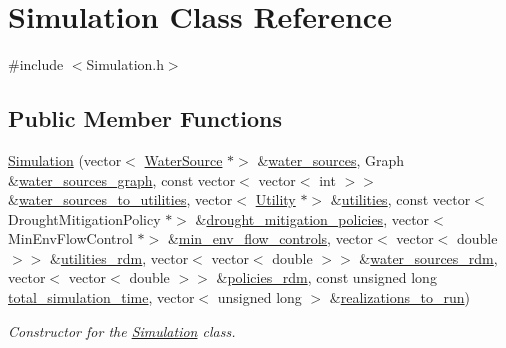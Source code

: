\hypertarget{classSimulation}{}\section{Simulation Class Reference}
\label{classSimulation}


{\ttfamily \#include $<$Simulation.\+h$>$}

\subsection*{Public Member Functions}
\begin{DoxyCompactItemize}
\item 
\mbox{\hyperlink{classSimulation_ac9b9db9c3de5f9ff33f6ea89e2435c87}{Simulation}} (vector$<$ \mbox{\hyperlink{classWaterSource}{Water\+Source}} $\ast$$>$ \&\mbox{\hyperlink{classSimulation_a7cf5edb885d26074e51e183408a3adab}{water\+\_\+sources}}, Graph \&\mbox{\hyperlink{classSimulation_a04d4514b77ae98ec66cb8c2d633b2a52}{water\+\_\+sources\+\_\+graph}}, const vector$<$ vector$<$ int $>$$>$ \&\mbox{\hyperlink{classSimulation_ab2825b5561679583c89a3936ce7dea39}{water\+\_\+sources\+\_\+to\+\_\+utilities}}, vector$<$ \mbox{\hyperlink{classUtility}{Utility}} $\ast$$>$ \&\mbox{\hyperlink{classSimulation_a0de77bedebd4b324d334340b11f5afa6}{utilities}}, const vector$<$ Drought\+Mitigation\+Policy $\ast$$>$ \&\mbox{\hyperlink{classSimulation_a23df9c17244a1cde0e32b42829623724}{drought\+\_\+mitigation\+\_\+policies}}, vector$<$ Min\+Env\+Flow\+Control $\ast$$>$ \&\mbox{\hyperlink{classSimulation_a91d4cbb85145e9ebb5a9cb5d24dace15}{min\+\_\+env\+\_\+flow\+\_\+controls}}, vector$<$ vector$<$ double $>$$>$ \&\mbox{\hyperlink{classSimulation_a0e0766513f36e2e95e83b0611c3c078c}{utilities\+\_\+rdm}}, vector$<$ vector$<$ double $>$$>$ \&\mbox{\hyperlink{classSimulation_afd35d5f1a11036d7c64668274ba0cc20}{water\+\_\+sources\+\_\+rdm}}, vector$<$ vector$<$ double $>$$>$ \&\mbox{\hyperlink{classSimulation_a4fd8d11506b6427577c9d8aa43932b2c}{policies\+\_\+rdm}}, const unsigned long \mbox{\hyperlink{classSimulation_a6c7ad426929c59e061750b6d923aa859}{total\+\_\+simulation\+\_\+time}}, vector$<$ unsigned long $>$ \&\mbox{\hyperlink{classSimulation_a6753fbf18cf9793b0ea3f4c070836af3}{realizations\+\_\+to\+\_\+run}})
\begin{DoxyCompactList}\small\item\em Constructor for the \mbox{\hyperlink{classSimulation}{Simulation}} class. \end{DoxyCompactList}\item 

\end{DoxyCompactItemize}
